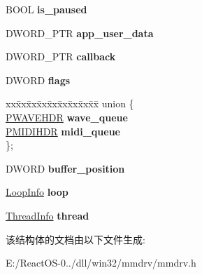 \begin{DoxyCompactItemize}
\begin{tabbing}
\end{tabbing}\item 
\mbox{\label{struct___session_info_accc383e0e4bd4b5e0ae2bc9459e45b58}} 
B\+O\+OL {\bfseries is\+\_\+paused}
\item 
\mbox{\label{struct___session_info_a2b314d42c0d1a4b3c79393c43e461782}} 
D\+W\+O\+R\+D\+\_\+\+P\+TR {\bfseries app\+\_\+user\+\_\+data}
\item 
\mbox{\label{struct___session_info_a88a852d72be3ad6fc804a0ed86992961}} 
D\+W\+O\+R\+D\+\_\+\+P\+TR {\bfseries callback}
\item 
\mbox{\label{struct___session_info_a11084672e3f3874a63060036c1b504f1}} 
D\+W\+O\+RD {\bfseries flags}
\item 
\mbox{\label{struct___session_info_a8dbda921948745dd470f249a38be68bb}} 
\begin{tabbing}
xx\=xx\=xx\=xx\=xx\=xx\=xx\=xx\=xx\=\kill
union \{\\
\>\hyperlink{structwavehdr__tag}{PWAVEHDR} {\bfseries wave\_queue}\\
\>\hyperlink{structmidihdr__tag}{PMIDIHDR} {\bfseries midi\_queue}\\
\}; \\

\end{tabbing}\item 
\mbox{\label{struct___session_info_aaad98728f44f1a71e9ac511b17fd1dde}} 
D\+W\+O\+RD {\bfseries buffer\+\_\+position}
\item 
\mbox{\label{struct___session_info_af22dcd8ce3238312dc18139c01ea06cc}} 
\hyperlink{struct___loop_info}{Loop\+Info} {\bfseries loop}
\item 
\mbox{\label{struct___session_info_a594fd061a5bcc945d71cffbe2d375b7c}} 
\hyperlink{struct___thread_info}{Thread\+Info} {\bfseries thread}
\end{DoxyCompactItemize}


该结构体的文档由以下文件生成\+:\begin{DoxyCompactItemize}
\item 
E\+:/\+React\+O\+S-\/0../dll/win32/mmdrv/mmdrv.\+h\end{DoxyCompactItemize}
